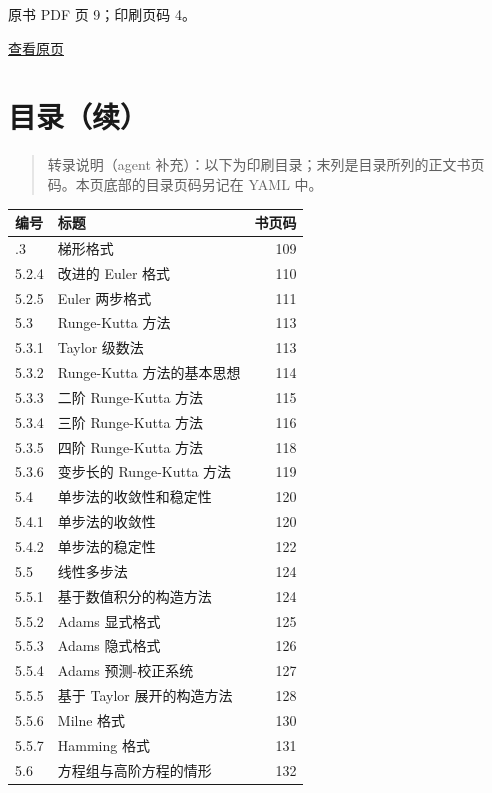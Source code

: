 \clearpage

原书 PDF 页 9；印刷页码 4。

\href{source-images/pdf-009.jpeg}{查看原页}

\section{目录（续）}\label{front-ux76eeux5f55ux7eed-2}

\begin{quote}
转录说明（agent 补充）：以下为印刷目录；末列是目录所列的正文书页码。本页底部的目录页码另记在 YAML 中。
\end{quote}

{\def\LTcaptype{none} %
\begin{longtable}[]{@{}llr@{}}
\toprule\noalign{}
编号 & 标题 & 书页码 \\
\midrule\noalign{}
\endhead
\bottomrule\noalign{}
\endlastfoot
5.2.3 & 梯形格式 & 109 \\
5.2.4 & 改进的 Euler 格式 & 110 \\
5.2.5 & Euler 两步格式 & 111 \\
5.3 & Runge-Kutta 方法 & 113 \\
5.3.1 & Taylor 级数法 & 113 \\
5.3.2 & Runge-Kutta 方法的基本思想 & 114 \\
5.3.3 & 二阶 Runge-Kutta 方法 & 115 \\
5.3.4 & 三阶 Runge-Kutta 方法 & 116 \\
5.3.5 & 四阶 Runge-Kutta 方法 & 118 \\
5.3.6 & 变步长的 Runge-Kutta 方法 & 119 \\
5.4 & 单步法的收敛性和稳定性 & 120 \\
5.4.1 & 单步法的收敛性 & 120 \\
5.4.2 & 单步法的稳定性 & 122 \\
5.5 & 线性多步法 & 124 \\
5.5.1 & 基于数值积分的构造方法 & 124 \\
5.5.2 & Adams 显式格式 & 125 \\
5.5.3 & Adams 隐式格式 & 126 \\
5.5.4 & Adams 预测-校正系统 & 127 \\
5.5.5 & 基于 Taylor 展开的构造方法 & 128 \\
5.5.6 & Milne 格式 & 130 \\
5.5.7 & Hamming 格式 & 131 \\
5.6 & 方程组与高阶方程的情形 & 132 \\

\end{longtable}}
